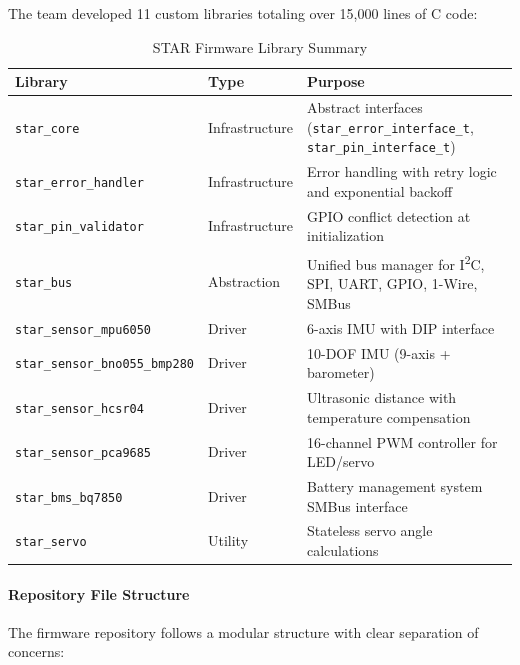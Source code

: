 The team developed 11 custom libraries totaling over 15,000 lines of C code:

\begin{table}[H]
\centering
\caption{STAR Firmware Library Summary}
\label{tab:star-libs}
\footnotesize
\begin{tabular}{@{}llp{6.5cm}@{}}
\toprule
\textbf{Library} & \textbf{Type} & \textbf{Purpose} \\
\midrule
\texttt{star\_core} & Infrastructure & Abstract interfaces (\texttt{star\_error\_interface\_t}, \texttt{star\_pin\_interface\_t}) \\
\texttt{star\_error\_handler} & Infrastructure & Error handling with retry logic and exponential backoff \\
\texttt{star\_pin\_validator} & Infrastructure & GPIO conflict detection at initialization \\
\texttt{star\_bus} & Abstraction & Unified bus manager for I\textsuperscript{2}C, SPI, UART, GPIO, 1-Wire, SMBus \\
\texttt{star\_sensor\_mpu6050} & Driver & 6-axis IMU with DIP interface \\
\texttt{star\_sensor\_bno055\_bmp280} & Driver & 10-DOF IMU (9-axis + barometer) \\
\texttt{star\_sensor\_hcsr04} & Driver & Ultrasonic distance with temperature compensation \\
\texttt{star\_sensor\_pca9685} & Driver & 16-channel PWM controller for LED/servo \\
\texttt{star\_bms\_bq7850} & Driver & Battery management system SMBus interface \\
\texttt{star\_servo} & Utility & Stateless servo angle calculations \\
\bottomrule
\end{tabular}
\end{table}

\paragraph{Repository File Structure}

The firmware repository follows a modular structure with clear separation of concerns:

